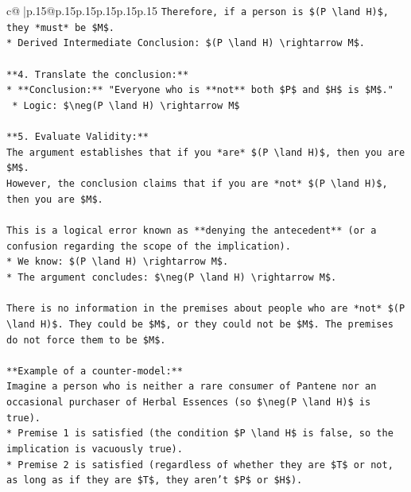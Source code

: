 \documentclass{article}
\begin{document}
{\begin{supertabular}{c@{$\;$}|p{.15\linewidth}@{}p{.15\linewidth}p{.15\linewidth}p{.15\linewidth}p{.15\linewidth}p{.15\linewidth}}
{{{\texttt{Therefore, if a person is \$(P \textbackslash{}land H)\$, they *must* be \$M\$.} \\
\texttt{*   Derived Intermediate Conclusion: \$(P \textbackslash{}land H) \textbackslash{}rightarrow M\$.} \\
\\ 
\texttt{**4. Translate the conclusion:**} \\
\texttt{*   **Conclusion:** "Everyone who is **not** both \$P\$ and \$H\$ is \$M\$."} \\
\texttt{    *   Logic: \$\textbackslash{}neg(P \textbackslash{}land H) \textbackslash{}rightarrow M\$} \\
\\ 
\texttt{**5. Evaluate Validity:**} \\
\texttt{The argument establishes that if you *are* \$(P \textbackslash{}land H)\$, then you are \$M\$.} \\
\texttt{However, the conclusion claims that if you are *not* \$(P \textbackslash{}land H)\$, then you are \$M\$.} \\
\\ 
\texttt{This is a logical error known as **denying the antecedent** (or a confusion regarding the scope of the implication).} \\
\texttt{*   We know: \$(P \textbackslash{}land H) \textbackslash{}rightarrow M\$.} \\
\texttt{*   The argument concludes: \$\textbackslash{}neg(P \textbackslash{}land H) \textbackslash{}rightarrow M\$.} \\
\\ 
\texttt{There is no information in the premises about people who are *not* \$(P \textbackslash{}land H)\$. They could be \$M\$, or they could not be \$M\$. The premises do not force them to be \$M\$.} \\
\\ 
\texttt{**Example of a counter{-}model:**} \\
\texttt{Imagine a person who is neither a rare consumer of Pantene nor an occasional purchaser of Herbal Essences (so \$\textbackslash{}neg(P \textbackslash{}land H)\$ is true).} \\
\texttt{*   Premise 1 is satisfied (the condition \$P \textbackslash{}land H\$ is false, so the implication is vacuously true).} \\
\texttt{*   Premise 2 is satisfied (regardless of whether they are \$T\$ or not, as long as if they are \$T\$, they aren't \$P\$ or \$H\$).} \\
}}}
\end{supertabular}}
\end{document}
